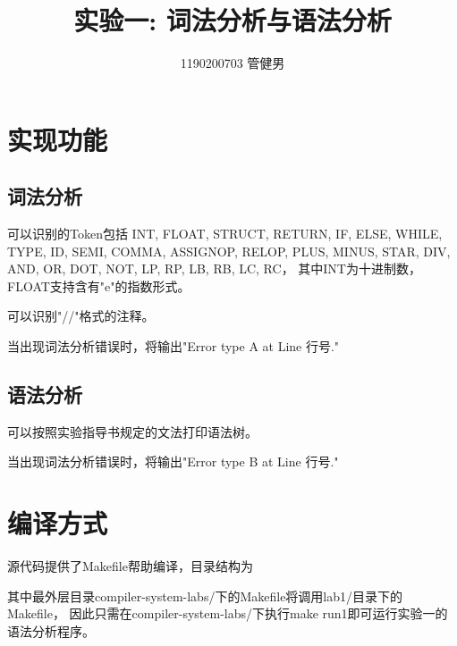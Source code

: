\documentclass{article}
\title{实验一: 词法分析与语法分析}
\author{1190200703 管健男}
\date{}
\begin{document}
\maketitle


\section{实现功能}

\subsection{词法分析}

可以识别的Token包括
INT, FLOAT, STRUCT, RETURN, IF, ELSE, WHILE, TYPE, ID, SEMI, COMMA, ASSIGNOP,
RELOP, PLUS, MINUS, STAR, DIV, AND, OR, DOT, NOT, LP, RP, LB, RB, LC, RC，
其中INT为十进制数，FLOAT支持含有"e"的指数形式。

可以识别"//"格式的注释。

当出现词法分析错误时，将输出"Error type A at Line 行号."

\subsection{语法分析}

可以按照实验指导书规定的文法打印语法树。

当出现词法分析错误时，将输出"Error type B at Line 行号."

\section{编译方式}

源代码提供了Makefile帮助编译，目录结构为

\begin{figure}[H]
    \centering
    \begin{minipage}{0.4\linewidth}
    \end{minipage}
\end{figure}

其中最外层目录compiler-system-labs/下的Makefile将调用lab1/目录下的Makefile，
因此只需在compiler-system-labs/下执行make run1即可运行实验一的语法分析程序。
\end{document}
